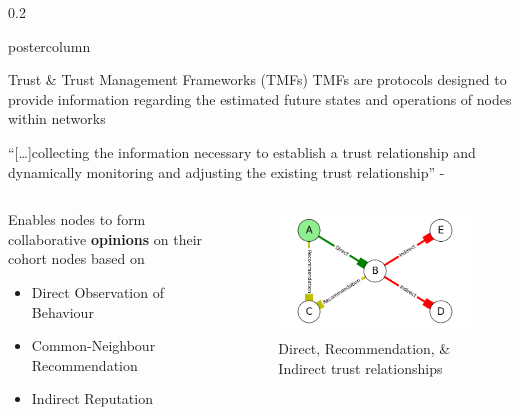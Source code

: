 \documentclass[final,hyperref={pdfpagelabels=false}]{beamer}
\def\colwidth{0.2\linewidth}
\begin{document}
\begin{frame}[fragile]
\begin{columns}[T]
\begin{column}{\colwidth}
\begin{beamercolorbox}[center,wd=\textwidth]{postercolumn}
\begin{minipage}[T]{.99\textwidth}
{\begin{block}{Trust \& Trust Management Frameworks (TMFs)}
							TMFs are protocols designed to provide information regarding the estimated future states and operations of nodes within networks
							\vspace{0.25\baselineskip}
														
							``[\ldots]collecting the information necessary to establish a trust relationship and dynamically monitoring and adjusting the existing trust relationship'' - \cite{Li2007}
														
							\begin{columns}[T]
								\begin{column}{0.416\textwidth}
									Enables nodes to form collaborative \textbf{opinions} on their cohort nodes based on
									\begin{itemize}
										\item Direct Observation of Behaviour
										\item Common-Neighbour Recommendation
										\item Indirect Reputation
									\end{itemize}
								\end{column}
								\begin{column}{0.416\textwidth}
									\begin{figure}[H]
										\centering
										\includegraphics[width=\linewidth]{node_relationships}
										\vspace{1ex}
										\caption{Direct, Recommendation, \& Indirect trust relationships}
									\end{figure}
								\end{column}
							\end{columns}
														

\end{block}}
\end{minipage}
\end{beamercolorbox}
\end{column}
\end{columns}
\end{frame}
\end{document}
